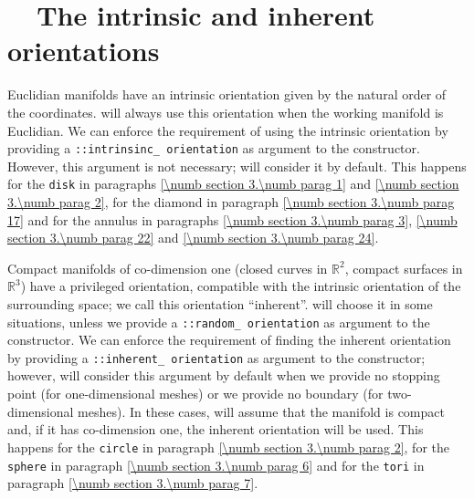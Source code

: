 \section{~~The intrinsic and inherent orientations}\label{\numb section 3.\numb parag 13}

Euclidian manifolds have an intrinsic orientation given by the natural order of the
coordinates.
{\ManiFEM} will always use this orientation when the working manifold is Euclidian.
We can enforce the requirement of using the intrinsic orientation by providing a
{\small\tt {}::intrinsinc\_\,orien\-tation} as argument to the {\small\tt {}} constructor.
However, this argument is not necessary; {\maniFEM} will consider it by default.
This happens for the {\small\tt disk} in paragraphs \ref{\numb section 3.\numb parag 1} and
\ref{\numb section 3.\numb parag 2}, for the diamond in
paragraph \ref{\numb section 3.\numb parag 17} and for the annulus in paragraphs
\ref{\numb section 3.\numb parag 3}, \ref{\numb section 3.\numb parag 22}
and \ref{\numb section 3.\numb parag 24}.

Compact manifolds of co-dimension one (closed curves in $ \mathbb{R}^2 $,
compact surfaces in $ \mathbb{R}^3 $) have a privileged orientation,
compatible with the intrinsic orientation of the surrounding space;
we call this orientation ``inherent''.
{\ManiFEM} will choose it in some situations, unless we provide a
{\small\tt {}::random\_\,orientation} as argument to the {\small\tt {}} constructor.
We can enforce the requirement of finding the inherent orientation by providing a
{\small\tt {}::inherent\_\,orientation} as argument to the {\small\tt {}} constructor;
however, {\maniFEM} will consider this argument by default when we provide no stopping
point (for one-dimensional meshes) or we provide no boundary (for two-dimensional meshes).
In these cases, {\maniFEM} will assume that the manifold is compact and, if it has
co-dimension one, the inherent orientation will be used.
This happens for the {\small\tt circle} in paragraph \ref{\numb section 3.\numb parag 2},
for the {\small\tt sphere} in paragraph \ref{\numb section 3.\numb parag 6} and for the
{\small\tt tori} in paragraph \ref{\numb section 3.\numb parag 7}.

